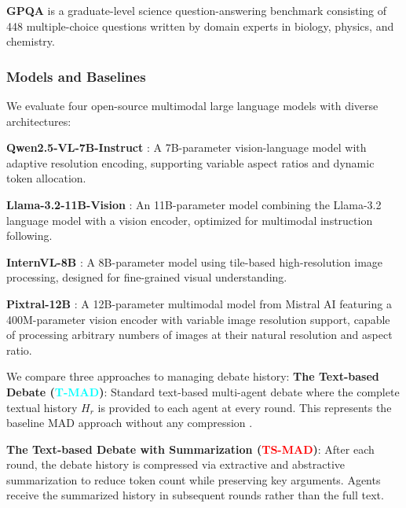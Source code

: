 \documentclass{article}
\theoremstyle{plain}
\theoremstyle{definition}
\theoremstyle{remark}
\begin{document}
\textbf{GPQA} \cite{rein2024gpqa} is a graduate-level science question-answering benchmark consisting of 448 multiple-choice questions written by domain experts in biology, physics, and chemistry.

\subsubsection{Models and Baselines}
\label{subsubsec:models_baselines}
We evaluate four open-source multimodal large language models with diverse architectures:

\noindent\textbf{Qwen2.5-VL-7B-Instruct} \cite{bai2025qwen2}: A 7B-parameter vision-language 
model with adaptive resolution encoding, supporting variable aspect ratios and dynamic 
token allocation.

\noindent\textbf{Llama-3.2-11B-Vision} \cite{meta2024llama}: An 11B-parameter model combining 
the Llama-3.2 language model with a vision encoder, optimized for multimodal instruction 
following.

\noindent\textbf{InternVL-8B} \cite{chen2024internvl}: A 8B-parameter model using tile-based 
high-resolution image processing, designed for fine-grained visual understanding.

\noindent\textbf{Pixtral-12B } \cite{agrawal2024pixtral}: A 12B-parameter multimodal model from  Mistral AI featuring a 400M-parameter vision encoder with variable image resolution 
support, capable of processing arbitrary numbers of images at their natural resolution 
and aspect ratio.

We compare three approaches to managing debate history:
\noindent\textbf{The Text-based Debate (\textcolor{cyan}{T-MAD})}: Standard text-based multi-agent debate where the complete 
textual history $H_r$ is provided to each agent at every round. This represents the 
baseline MAD approach without any compression \cite{khan2024debating, du2023improving}.

\noindent\textbf{The Text-based Debate with Summarization (\textcolor{red}{TS-MAD})}: After each round, the debate history is 
compressed via extractive and abstractive summarization to reduce token count while 
preserving key arguments. Agents receive the summarized history in subsequent rounds 
rather than the full text\cite{chen2024reconcile, liu2025breaking}.
\end{document}
